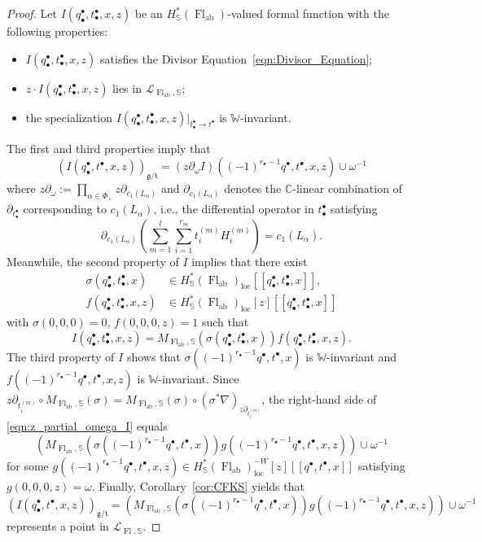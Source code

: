 \documentclass[a4paper,12pt]{amsart}
\numberwithin{equation}{section}
\theoremstyle{definition}
\newcommand{\C}{\mathbb{C}}
\newcommand{\bbS}{\mathbb{S}}
\newcommand{\W}{\mathbb{W}}
\newcommand{\cL}{\mathcal{L}}
\newcommand{\gt}{{\mathfrak{g}/\mathfrak{t}}}
\newcommand{\loc}{{\operatorname{loc}}}
\newcommand{\FlG}{\operatorname{Fl}}
\newcommand{\FlT}{\operatorname{Fl}_{\operatorname{ab}}}
\begin{document}
\begin{proof} 
Let $I(q^\bullet_\bullet,t_\bullet^\bullet,x,z)$ be an $H^*_\bbS(\FlT)$-valued formal function with the following properties:
\begin{itemize}
    \item 
    $I(q^\bullet_\bullet,t_\bullet^\bullet,x,z)$ satisfies the Divisor Equation~\eqref{eqn:Divisor_Equation};
    \item 
    $z\cdot I(q^\bullet_\bullet,t_\bullet^\bullet,x,z)$ lies in $\cL_{\FlT,\bbS}$;
    \item 
    the specialization $I(q^\bullet_\bullet,t^\bullet_\bullet,x,z)|_{t_\bullet^\bullet\to t^\bullet}$ is $\W$-invariant.
\end{itemize}
The first and third properties imply that 
\begin{equation}\label{eqn:z_partial_omega_I}
    (I(q^\bullet_\bullet,t^\bullet,x,z))_\gt = (z\partial_\omega I) ((-1)^{r_\bullet-1}q^\bullet,t^\bullet,x,z) \cup \omega^{-1}
\end{equation}
where $z\partial_\omega:=\prod_{\alpha\in\Phi_+} z\partial_{c_1(L_\alpha)}$ and $\partial_{c_1(L_\alpha)}$ denotes the $\C$-linear combination of $\partial_{t_\bullet^\bullet}$ corresponding to $c_1(L_\alpha)$, i.e., the differential operator in $t_\bullet^\bullet$ satisfying 
\[
\partial_{c_1(L_\alpha)} \left( \sum_{m=1}^l \sum_{i=1}^{r_m} t^{(m)}_i H^{(m)}_i \right) = c_1(L_\alpha).
\]
Meanwhile, the second property of $I$ implies that there exist 
\begin{align*}
    \sigma(q^\bullet_\bullet,t^\bullet_\bullet,x) &\in H^*_\bbS(\FlT)_\loc[\![q^\bullet_\bullet,t^\bullet_\bullet,x]\!], \\
    f(q^\bullet_\bullet,t^\bullet_\bullet,x,z) &\in H^*_\bbS(\FlT)_\loc[z][\![q^\bullet_\bullet,t^\bullet_\bullet,x]\!]
\end{align*}
with $\sigma(0,0,0)=0$, $f(0,0,0,z)=1$ such that
\[
I(q^\bullet_\bullet,t_\bullet^\bullet,x,z) = M_{\FlT,\bbS}(\sigma(q^\bullet_\bullet,t^\bullet_\bullet,x)) f(q^\bullet_\bullet,t^\bullet_\bullet,x,z).
\]
The third property of $I$ shows that $\sigma((-1)^{r_\bullet-1}q^\bullet,t^\bullet,x)$ is $\W$-invariant and $f((-1)^{r_\bullet-1}q^\bullet,t^\bullet,x,z)$ is $\W$-invariant.
Since $z\partial_{t^{(m)}_i}\circ M_{\FlT,\bbS}(\sigma) = M_{\FlT,\bbS}(\sigma) \circ (\sigma^*\nabla)_{z\partial_{t^{(m)}_i}}$, the right-hand side of \eqref{eqn:z_partial_omega_I} equals
\[
(M_{\FlT,\bbS}(\sigma((-1)^{r_\bullet-1}q^\bullet,t^\bullet,x)) g((-1)^{r_\bullet-1}q^\bullet,t^\bullet,x,z))\cup\omega^{-1}
\]
for some $g((-1)^{r_\bullet-1}q^\bullet,t^\bullet,x,z)\in H^*_\bbS(\FlT)^{-W}_\loc[z][\![q^\bullet,t^\bullet,x]\!]$ satisfying
$g(0,0,0,z)=\omega$.
Finally, Corollary~\ref{cor:CFKS} yields that 
\[
(I(q^\bullet_\bullet,t^\bullet,x,z))_\gt=(M_{\FlT,\bbS}(\sigma((-1)^{r_\bullet-1}q^\bullet,t^\bullet,x)) g((-1)^{r_\bullet-1}q^\bullet,t^\bullet,x,z))\cup\omega^{-1}
\]
represents a point in $\cL_{\FlG,\bbS}$.
\end{proof}
\end{document}
